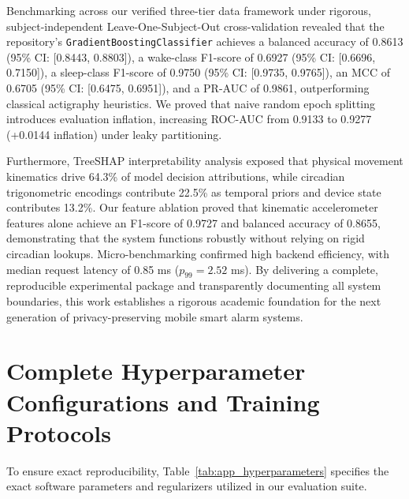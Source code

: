 \documentclass[journal,11pt,onecolumn]{IEEEtran}
\begin{document}
Benchmarking across our verified three-tier data framework under rigorous, subject-independent Leave-One-Subject-Out cross-validation revealed that the repository's \texttt{GradientBoostingClassifier} achieves a balanced accuracy of 0.8613 (95\% CI: [0.8443, 0.8803]), a wake-class F1-score of 0.6927 (95\% CI: [0.6696, 0.7150]), a sleep-class F1-score of 0.9750 (95\% CI: [0.9735, 0.9765]), an MCC of 0.6705 (95\% CI: [0.6475, 0.6951]), and a PR-AUC of 0.9861, outperforming classical actigraphy heuristics. We proved that naive random epoch splitting introduces evaluation inflation, increasing ROC-AUC from 0.9133 to 0.9277 (+0.0144 inflation) under leaky partitioning. 

Furthermore, TreeSHAP interpretability analysis exposed that physical movement kinematics drive 64.3\% of model decision attributions, while circadian trigonometric encodings contribute 22.5\% as temporal priors and device state contributes 13.2\%. Our feature ablation proved that kinematic accelerometer features alone achieve an F1-score of 0.9727 and balanced accuracy of 0.8655, demonstrating that the system functions robustly without relying on rigid circadian lookups. Micro-benchmarking confirmed high backend efficiency, with median request latency of 0.85 ms ($p_{99} = 2.52$ ms). By delivering a complete, reproducible experimental package and transparently documenting all system boundaries, this work establishes a rigorous academic foundation for the next generation of privacy-preserving mobile smart alarm systems.




\clearpage
\appendices\hypertarget{sec:appendices}{}

\section{Complete Hyperparameter Configurations and Training Protocols}
\label{app:hyperparameters}

To ensure exact reproducibility, Table~\ref{tab:app_hyperparameters} specifies the exact software parameters and regularizers utilized in our evaluation suite.
\end{document}
